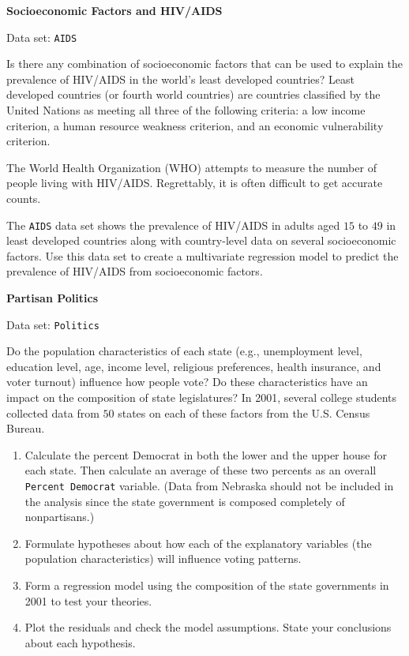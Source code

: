 \documentclass[
]{report}
\begin{document}
\begin{list}{E..}{ \setlength{\itemsep}{1.2em}}
  \item \textbf{Socioeconomic Factors and HIV/AIDS}

Data set: \texttt{AIDS}

Is there any combination of socioeconomic factors that can be used to explain the prevalence of HIV/AIDS in the world’s least developed countries? Least developed countries (or fourth world countries) are countries classified by the United Nations as meeting all three of the following criteria: a low income criterion, a human resource weakness criterion, and an economic vulnerability criterion.

The World Health Organization (WHO) attempts to measure the number of people living with HIV/AIDS. Regrettably, it is often difficult to get accurate counts.

The \texttt{AIDS} data set shows the prevalence of HIV/AIDS in adults aged $15$ to $49$ in least developed countries along with country-level data on several socioeconomic factors. Use this data set to create a multivariate regression model to predict the prevalence of HIV/AIDS from socioeconomic factors.

  \item \textbf{Partisan Politics}

Data set: \texttt{Politics}

Do the population characteristics of each state (e.g., unemployment level, education level, age, income level, religious preferences, health insurance, and voter turnout) influence how people vote? Do these characteristics have an impact on the composition of state legislatures? In 2001, several college students collected data from $50$ states on each of these factors from the U.S. Census Bureau.

    \begin{enumerate}
      \item Calculate the percent Democrat in both the lower and the upper house for each state. Then calculate an average of these two percents as an overall \texttt{Percent Democrat} variable. (Data from Nebraska should not be included in the analysis since the state government is composed completely of nonpartisans.)
      \item Formulate hypotheses about how each of the explanatory variables (the population characteristics) will influence voting patterns.
      \item Form a regression model using the composition of the state governments in 2001 to test your theories.
      \item Plot the residuals and check the model assumptions. State your conclusions about each hypothesis.
    \end{enumerate}


\end{list}
\end{document}
